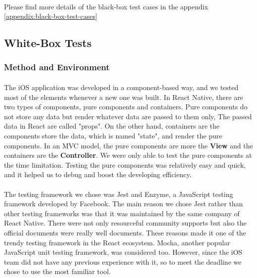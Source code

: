 \documentclass[12pt,a4paper]{article}
\begin{document}
          \paragraph{} Please find more details of the black-box test cases in the appendix \ref{appendix:black-box-test-cases}

      \subsection{White-Box Tests}
        \subsubsection{Method and Environment} %
          \paragraph{}The iOS application was developed in a component-based way, and we tested most of the elements whenever a new one was built. In React Native, there are two types of components, pure components and containers. Pure components do not store any data but render whatever data are passed to them only, The passed data in React are called "props". On the other hand, containers are the components store the data, which is named "state", and render the pure components. In an MVC model, the pure components are more the {\bf View} and the containers are the {\bf Controller}. We were only able to test the pure components at the time limitation. Testing the pure components was relatively easy and quick, and it helped us to debug and boost the developing efficiency.
          
          \paragraph{}The testing framework we chose was Jest\cite{Jest} and Enzyme\cite{Enzyme}, a JavaScript testing framework developed by Facebook. The main reason we chose Jest rather than other testing frameworks was that it was maintained by the same company of React Native. There were not only resourceful community supports but also the official documents were really well documents. These reasons made it one of the trendy testing framework in the React ecosystem. Mocha, another popular JavaScript unit testing framework, was considered too. However, since the iOS team did not have any previous experience with it, so to meet the deadline we chose to use the most familiar tool.
        
\end{document}
